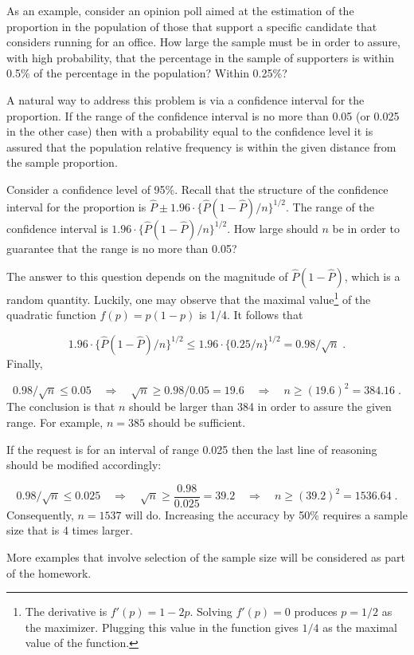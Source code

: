 \documentclass[
]{krantz}
\theoremstyle{definition}
\theoremstyle{definition}
\theoremstyle{definition}
\theoremstyle{remark}
\begin{document}
As an example, consider an opinion poll aimed at the estimation of the
proportion in the population of those that support a specific candidate
that considers running for an office. How large the sample must be in
order to assure, with high probability, that the percentage in the
sample of supporters is within 0.5\% of the percentage in the population?
Within 0.25\%?

A natural way to address this problem is via a confidence interval for
the proportion. If the range of the confidence interval is no more than
0.05 (or 0.025 in the other case) then with a probability equal to the
confidence level it is assured that the population relative frequency is
within the given distance from the sample proportion.

Consider a confidence level of 95\%. Recall that the structure of the
confidence interval for the proportion is
\(\hat P \pm 1.96 \cdot \{\hat P (1-\hat P)/n\}^{1/2}\). The range of the
confidence interval is \(1.96 \cdot \{\hat P (1-\hat P)/n\}^{1/2}\). How
large should \(n\) be in order to guarantee that the range is no more than
0.05?

The answer to this question depends on the magnitude of
\(\hat P (1-\hat P)\), which is a random quantity. Luckily, one may
observe that the maximal value\footnote{The derivative is \(f'(p) = 1-2p\). Solving \(f'(p)=0\) produces
  \(p=1/2\) as the maximizer. Plugging this value in the function gives
  \(1/4\) as the maximal value of the function.} of the quadratic function
\(f(p) = p (1-p)\) is 1/4. It follows that

\[1.96 \cdot \{\hat P (1-\hat P)/n\}^{1/2} \leq 1.96 \cdot \{0.25/n\}^{1/2} = 0.98/\sqrt{n}\;.\]
Finally,

\[0.98/\sqrt{n} \leq 0.05 \quad \Longrightarrow \quad \sqrt{n} \geq 0.98/0.05 = 19.6
\quad \Longrightarrow \quad  n \geq (19.6)^2 = 384.16\;.\] The
conclusion is that \(n\) should be larger than 384 in order to assure the
given range. For example, \(n=385\) should be sufficient.

If the request is for an interval of range 0.025 then the last line of
reasoning should be modified accordingly:

\[0.98/\sqrt{n} \leq 0.025 \quad \Longrightarrow \quad \sqrt{n} \geq \frac{0.98}{0.025} = 39.2
\quad \Longrightarrow \quad  n \geq (39.2)^2 = 1536.64\;.\]
Consequently, \(n=1537\) will do. Increasing the accuracy by 50\% requires
a sample size that is 4 times larger.

More examples that involve selection of the sample size will be
considered as part of the homework.
\end{document}
